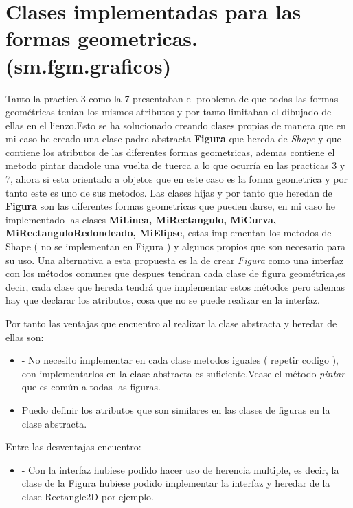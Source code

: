\section{Clases implementadas para las formas geometricas.(sm.fgm.graficos)}
Tanto la practica 3 como la 7 presentaban el problema de que todas las formas geométricas tenian los mismos atributos y por tanto limitaban el dibujado\cite{graphics} de ellas en el lienzo.Esto se ha solucionado creando clases propias de manera que en mi caso he creado una clase padre abstracta \textbf{Figura} que hereda de \emph{Shape} y que contiene los atributos de las diferentes formas geometricas, ademas contiene el metodo pintar dandole una vuelta de tuerca a lo que ocurría en las practicas 3 y 7, ahora si esta orientado a objetos que en este caso es la forma geometrica y por tanto este es uno de sus metodos.
Las clases hijas y por tanto que heredan de \textbf{Figura} son las diferentes formas geometricas que pueden darse, en mi caso he implementado las clases \textbf{MiLinea, MiRectangulo, MiCurva, MiRectanguloRedondeado, MiElipse}, estas implementan los metodos de Shape ( no se implementan en Figura ) y algunos propios que son necesario para su uso.
Una alternativa a esta propuesta es la de crear \emph{Figura} como una interfaz con los métodos comunes que despues tendran cada clase de figura geométrica,es decir, cada clase que hereda tendrá que implementar estos métodos pero ademas hay que declarar los atributos, cosa que no se puede realizar en la interfaz.

Por tanto las ventajas que encuentro al realizar la clase abstracta y heredar de ellas son:
\begin{itemize}
\item - No necesito implementar en cada clase metodos iguales ( repetir codigo ), con implementarlos en la clase abstracta es suficiente.Vease el método \emph{pintar} que es común a todas las figuras.
\item  Puedo definir los atributos que son similares en las clases de figuras en la clase abstracta.
\end{itemize}
Entre las desventajas encuentro:
\begin{itemize}
\item - Con la interfaz hubiese podido hacer uso de herencia multiple, es decir, la clase de la Figura hubiese podido implementar la interfaz y heredar de la clase Rectangle2D por ejemplo.
\end{itemize}

